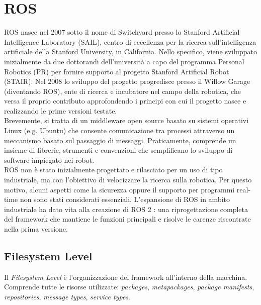 
\chapter{ROS}\label{ch:ros}
\ac{ROS} \cite{ROS} nasce nel 2007 sotto il nome di Switchyard presso lo Stanford Artificial Intelligence Laboratory (SAIL), centro di eccellenza per la ricerca sull'intelligenza artificiale della Stanford University, in California. Nello specifico, viene sviluppato inizialmente da due dottorandi dell'università a capo del programma Personal Robotics (PR) per fornire supporto al progetto Stanford Artificial Robot (STAIR). Nel 2008 lo sviluppo del progetto progredisce presso il Willow Garage (diventando \acs{ROS}), ente di ricerca e incubatore nel campo della robotica, che versa il proprio contributo approfondendo i principi con cui il progetto nasce e realizzando le prime versioni testate.\\

Brevemente, si tratta di un middleware open source basato su sistemi operativi Linux (e.g. Ubuntu) che consente comunicazione tra processi attraverso un meccanismo basato sul passaggio di messaggi. Praticamente, comprende un insieme di librerie, strumenti e convenzioni che semplificano lo sviluppo di software impiegato nei robot.\\

\acs{ROS} non è stato inizialmente progettato e rilasciato per un uso di tipo industriale, ma con l'obiettivo di velocizzare la ricerca sulla robotica. Per questo motivo, alcuni aspetti come la sicurezza oppure il supporto per programmi real-time non sono stati considerati essenziali. L'espansione di \acs{ROS} in ambito industriale ha dato vita alla creazione di \acs{ROS} 2 \cite{ROS2}: una riprogettazione completa del framework che mantiene le funzioni principali e risolve le carenze riscontrate nella prima versione.


\section{Filesystem Level}
Il \emph{Filesystem Level} è l'organizzazione del framework all'interno della macchina. Comprende tutte le risorse utilizzate: \emph{packages}, \emph{metapackages}, \emph{package manifests}, \emph{repositories}, \emph{message types}, \emph{service types}.

